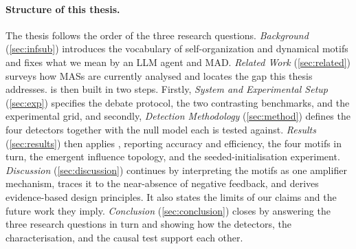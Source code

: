 \paragraph{Structure of this thesis.}
The thesis follows the order of the three research questions. \emph{Background}
(\autoref{sec:infsub}) introduces the vocabulary of self-organization and
dynamical motifs and fixes what we mean by an \ac{LLM} agent and \ac{MAD}.
\emph{Related Work} (\autoref{sec:related}) surveys how \acp{MAS} are
currently analysed and locates the gap this thesis addresses. \suitename{} is
then built in two steps. Firstly, \emph{System and Experimental Setup}
(\autoref{sec:exp}) specifies the debate protocol, the two contrasting
benchmarks, and the experimental grid, and secondly, \emph{Detection Methodology}
(\autoref{sec:method}) defines the four \suitename{} detectors together with the
null model each is tested against. \emph{Results} (\autoref{sec:results}) then applies
\suitename{}, reporting accuracy and efficiency, the four motifs in turn, the
emergent influence topology, and the seeded-initialisation experiment.
\emph{Discussion} (\autoref{sec:discussion}) continues by interpreting the motifs as one
amplifier mechanism, traces it to the near-absence of negative feedback, and derives
evidence-based design principles. It also states the limits of our claims and
the future work they imply. \emph{Conclusion} (\autoref{sec:conclusion}) closes
by answering the three research questions in turn and showing how the
detectors, the characterisation, and the causal test support each other.